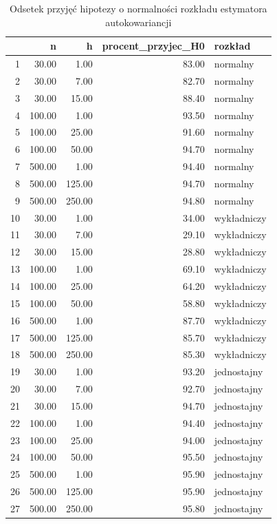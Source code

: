 \documentclass[10pt, a4paper]{article}\usepackage[]{graphicx}\usepackage[]{xcolor}
\begin{document}
\begin{table}[ht]
\centering
\caption{Odsetek przyjęć hipotezy o normalności rozkładu estymatora autokowariancji} 
\label{tab:autokow_normalnosc}
\begin{tabular}{rrrrl}
  \hline
 & n & h & procent\_przyjec\_H0 & rozkład \\ 
  \hline
1 & 30.00 & 1.00 & 83.00 & normalny \\ 
  2 & 30.00 & 7.00 & 82.70 & normalny \\ 
  3 & 30.00 & 15.00 & 88.40 & normalny \\ 
  4 & 100.00 & 1.00 & 93.50 & normalny \\ 
  5 & 100.00 & 25.00 & 91.60 & normalny \\ 
  6 & 100.00 & 50.00 & 94.70 & normalny \\ 
  7 & 500.00 & 1.00 & 94.40 & normalny \\ 
  8 & 500.00 & 125.00 & 94.70 & normalny \\ 
  9 & 500.00 & 250.00 & 94.80 & normalny \\ 
  10 & 30.00 & 1.00 & 34.00 & wykładniczy \\ 
  11 & 30.00 & 7.00 & 29.10 & wykładniczy \\ 
  12 & 30.00 & 15.00 & 28.80 & wykładniczy \\ 
  13 & 100.00 & 1.00 & 69.10 & wykładniczy \\ 
  14 & 100.00 & 25.00 & 64.20 & wykładniczy \\ 
  15 & 100.00 & 50.00 & 58.80 & wykładniczy \\ 
  16 & 500.00 & 1.00 & 87.70 & wykładniczy \\ 
  17 & 500.00 & 125.00 & 85.70 & wykładniczy \\ 
  18 & 500.00 & 250.00 & 85.30 & wykładniczy \\ 
  19 & 30.00 & 1.00 & 93.20 & jednostajny \\ 
  20 & 30.00 & 7.00 & 92.70 & jednostajny \\ 
  21 & 30.00 & 15.00 & 94.70 & jednostajny \\ 
  22 & 100.00 & 1.00 & 94.40 & jednostajny \\ 
  23 & 100.00 & 25.00 & 94.00 & jednostajny \\ 
  24 & 100.00 & 50.00 & 95.50 & jednostajny \\ 
  25 & 500.00 & 1.00 & 95.90 & jednostajny \\ 
  26 & 500.00 & 125.00 & 95.90 & jednostajny \\ 
  27 & 500.00 & 250.00 & 95.80 & jednostajny \\ 
   \hline
\end{tabular}
\end{table}
\end{document}
